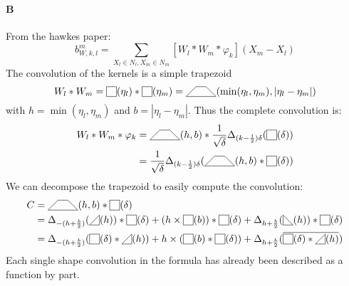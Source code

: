 \documentclass[a4paper,10pt]{article}
\newcommand\Shifted[2]{\Delta_{#1}(#2)}
\newcommand\Reversed[1]{\overline{#1}} %
\newcommand\SymSquare{\begin{tikzpicture}[baseline=0.5ex]%
        \draw (0,0) -- (0,1em) -- (1em,1em) -- (1em,0) -- cycle;
\end{tikzpicture}}
\newcommand\Indicator[1]{\SymSquare(#1)}
\newcommand\SymPositiveTriangle{\begin{tikzpicture}[baseline=0.5ex]%
        \draw (0,0) -- (1em,0em) -- (1em,1em) -- cycle;
\end{tikzpicture}}
\newcommand\PositiveTriangle[1]{\SymPositiveTriangle(#1)}
\newcommand\SymNegativeTriangle{\begin{tikzpicture}[baseline=0.5ex]%
        \draw (0,0) -- (0,1em) -- (1em,0em) -- cycle;
\end{tikzpicture}}
\newcommand\NegativeTriangle[1]{\SymNegativeTriangle(#1)}
\newcommand\SymTrapezoid{\begin{tikzpicture}[baseline=0.5ex]%
        \draw (0,0) -- (3em,0) -- (2em,1em) -- (1em,1em) -- cycle;
\end{tikzpicture}}
\newcommand\Trapezoid[2]{\SymTrapezoid(#1,#2)}%
\newcommand\Convolution{\ast}
\begin{document}
\paragraph{B}
From the hawkes paper:
\[ b_{W,k,l}^m = \sum_{X_l \in N_l, X_m \in N_m} [W_l \Convolution W_m \Convolution \varphi_k] (X_m - X_l) \]
The convolution of the kernels is a simple trapezoid
\[ W_l \Convolution W_m = \Indicator{\eta_l} \Convolution \Indicator{\eta_m} = \Trapezoid{\min(\eta_l,\eta_m)}{|\eta_l-\eta_m|} \]
with $h = \min(\eta_l,\eta_m)$ and $b = |\eta_l-\eta_m|$.
Thus the complete convolution is:
\[ \begin{split}
    W_l \Convolution W_m \Convolution \varphi_k & = \Trapezoid{h}{b} \Convolution \frac{1}{\sqrt{\delta}} \Shifted{(k-\frac{1}{2})\delta}{\Indicator{\delta}} \\
    &= \frac{1}{\sqrt{\delta}} \Shifted{(k-\frac{1}{2})\delta}{\Trapezoid{h}{b} \Convolution \Indicator{\delta}}
\end{split} \]
We can decompose the trapezoid to easily compute the convolution:
\[ \begin{split}
    C & = \Trapezoid{h}{b} \Convolution \Indicator{\delta} \\
    & = \Shifted{-(h+\frac{b}{2})}{\PositiveTriangle{h}} \Convolution \Indicator{\delta}  + (h \times \Indicator{b}) \Convolution \Indicator{\delta} + \Shifted{h+\frac{b}{2}}{\NegativeTriangle{h}} \Convolution \Indicator{\delta} \\
    & = \Shifted{-(h+\frac{b}{2})}{\Indicator{\delta} \Convolution \PositiveTriangle{h}} + h \times (\Indicator{b} \Convolution \Indicator{\delta}) + \Shifted{h+\frac{b}{2}}{\Reversed{\Indicator{\delta} \Convolution \PositiveTriangle{h}}}
\end{split} \]
Each single shape convolution in the formula has already been described as a function by part.
\end{document}
